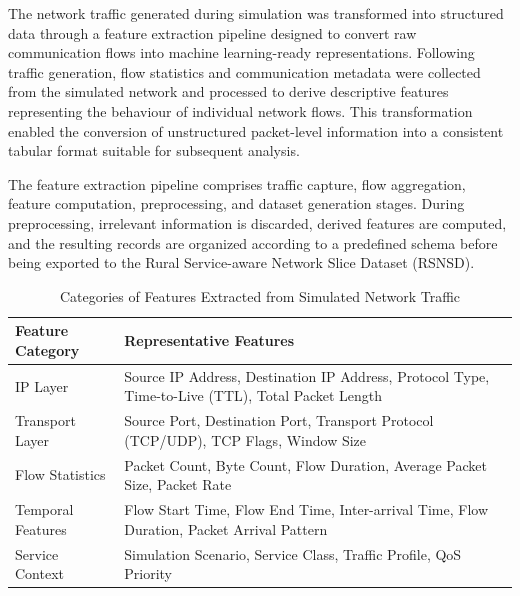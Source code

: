 \documentclass[12pt,a4paper]{report}
\begin{document}
The network traffic generated during simulation was transformed into structured data through a feature extraction pipeline designed to convert raw communication flows into machine learning-ready representations. Following traffic generation, flow statistics and communication metadata were collected from the simulated network and processed to derive descriptive features representing the behaviour of individual network flows. This transformation enabled the conversion of unstructured packet-level information into a consistent tabular format suitable for subsequent analysis.

The feature extraction pipeline comprises traffic capture, flow aggregation, feature computation, preprocessing, and dataset generation stages. During preprocessing, irrelevant information is discarded, derived features are computed, and the resulting records are organized according to a predefined schema before being exported to the Rural Service-aware Network Slice Dataset (RSNSD).

	
\begin{table}[H]
	\centering
	\caption{Categories of Features Extracted from Simulated Network Traffic}
	\label{tab:features}
	
	\begin{tabular}{|p{4cm}|p{8cm}|}
		\hline
		
		\textbf{Feature Category} &
		\textbf{Representative Features}
		\\
		\hline
		
		IP Layer &
		Source IP Address, Destination IP Address, Protocol Type, Time-to-Live (TTL), Total Packet Length
		\\
		\hline
		
		Transport Layer &
		Source Port, Destination Port, Transport Protocol (TCP/UDP), TCP Flags, Window Size
		\\
		\hline
		
		Flow Statistics &
		Packet Count, Byte Count, Flow Duration, Average Packet Size, Packet Rate
		\\
		\hline
		
		Temporal Features &
		Flow Start Time, Flow End Time, Inter-arrival Time, Flow Duration, Packet Arrival Pattern
		\\
		\hline
		
		Service Context &
		Simulation Scenario, Service Class, Traffic Profile, QoS Priority
		\\
		\hline
		
	\end{tabular}
	
\end{table}
\end{document}
